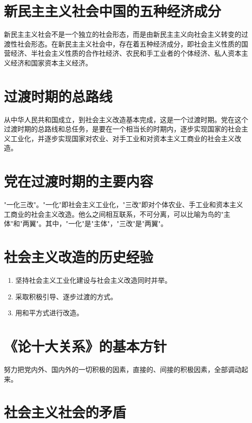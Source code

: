\documentclass[12pt, a4paper, oneside]{ctexbook}
\begin{document}
\section{新民主主义社会中国的五种经济成分}

新民主主义社会不是一个独立的社会形态，而是由新民主主义向社会主义转变的过渡性社会形态。在新民主主义社会中，存在着五种经济成分，即社会主义性质的国营经济、半社会主义性质的合作社经济、农民和手工业者的个体经济、私人资本主义经济和国家资本主义经济。

\section{过渡时期的总路线}

从中华人民共和国成立，到社会主义改造基本完成，这是一个过渡时期。党在这个过渡时期的总路线和总任务，是要在一个相当长的时期内，逐步实现国家的社会主义工业化，并逐步实现国家对农业、对手工业和对资本主义工商业的社会主义改造。

\section{党在过渡时期的主要内容}

"一化三改"。"一化"即社会主义工业化，"三改"即对个体农业、手工业和资本主义工商业的社会主义改造。他么之间相互联系，不可分离，可以比喻为鸟的"主体"和"两翼"。其中，"一化"是"主体"，"三改"是"两翼"。

\section{社会主义改造的历史经验}

\begin{enumerate}[label=（\arabic*）]
\item 坚持社会主义工业化建设与社会主义改造同时并举。

\item 采取积极引导、逐步过渡的方式。

\item 用和平方式进行改造。
\end{enumerate}

\section{《论十大关系》的基本方针}

努力把党内外、国内外的一切积极的因素，直接的、间接的积极因素，全部调动起来。

\section{社会主义社会的矛盾}
\end{document}
